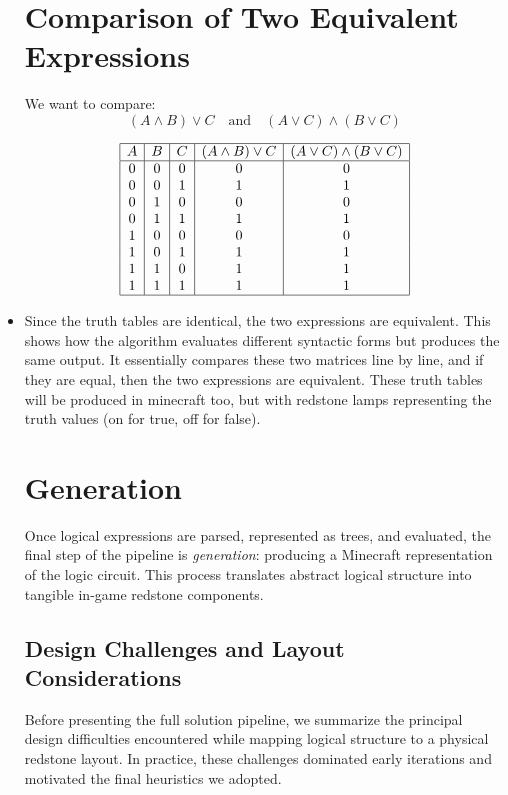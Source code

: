 \documentclass[11pt]{diazessay} %
\begin{document}
\begin{itemize}
\section*{Comparison of Two Equivalent Expressions}

We want to compare:
\[
(A \wedge B) \vee C \quad \text{and} \quad (A \vee C) \wedge (B \vee C)
\]

\bigskip

\[
\begin{array}{|c|c|c|c|c|}
\hline
A & B & C & (A \land B) \lor C & (A \lor C) \land (B \lor C) \\
\hline
0 & 0 & 0 & 0 & 0 \\
0 & 0 & 1 & 1 & 1 \\
0 & 1 & 0 & 0 & 0 \\
0 & 1 & 1 & 1 & 1 \\
1 & 0 & 0 & 0 & 0 \\
1 & 0 & 1 & 1 & 1 \\
1 & 1 & 0 & 1 & 1 \\
1 & 1 & 1 & 1 & 1 \\
\hline
\end{array}
\]

\bigskip


\item Since the truth tables are identical, the two expressions are equivalent.  
This shows how the algorithm evaluates different syntactic forms but produces the same output. It essentially compares these two matrices line by line, and if they are equal, then the two expressions are equivalent.
These truth tables will be produced in minecraft too, but with redstone lamps representing the truth values (on for true, off for false).

\section{Generation}

Once logical expressions are parsed, represented as trees, and evaluated,
the final step of the pipeline is \textit{generation}: producing a Minecraft
representation of the logic circuit. This process translates abstract
logical structure into tangible in-game redstone components.

\subsection{Design Challenges and Layout Considerations}

Before presenting the full solution pipeline, we summarize the principal design
difficulties encountered while mapping logical structure to a physical redstone
layout. In practice, these challenges dominated early iterations and motivated
the final heuristics we adopted.


\end{itemize}
\end{document}
